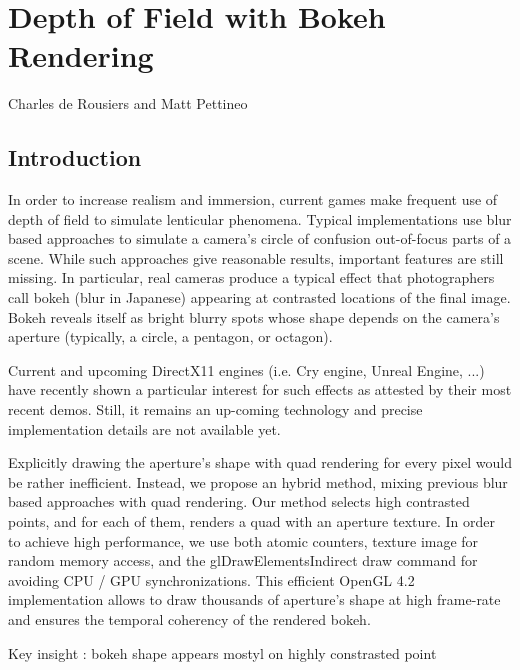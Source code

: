 \chapter{Depth of Field with Bokeh Rendering}{Charles de Rousiers and Matt Pettineo}
\label{BokehRendering}

\section{Introduction}

In order to increase realism and immersion, current games make frequent use of depth of field to simulate lenticular phenomena. Typical implementations use blur based approaches to simulate a camera’s circle of confusion out-of-focus parts of a scene. While such approaches give reasonable results, important features are still missing. In particular, real cameras produce a typical effect that photographers call bokeh (blur in Japanese) appearing at contrasted locations of the final image. Bokeh reveals itself as  bright blurry spots whose shape depends on the camera’s aperture (typically, a circle, a pentagon, or octagon). 

Current and upcoming DirectX11 engines (i.e. Cry engine, Unreal Engine, ...) have recently shown a particular interest for such effects as attested by their most recent demos. Still, it  remains an up-coming technology and precise implementation details are not available yet.

Explicitly drawing the aperture’s shape with quad rendering for every pixel would be rather inefficient. Instead, we propose an hybrid method, mixing previous blur based approaches with quad rendering. Our method selects high contrasted points, and for each of them, renders a quad with an aperture texture. In order to achieve high performance, we use both atomic counters, texture image for random memory access, and the glDrawElementsIndirect draw command for avoiding CPU / GPU synchronizations. This efficient OpenGL 4.2 implementation allows to draw thousands of aperture’s shape at high frame-rate and ensures the temporal coherency of the rendered bokeh.


Key insight : bokeh shape appears mostyl on highly constrasted point 


